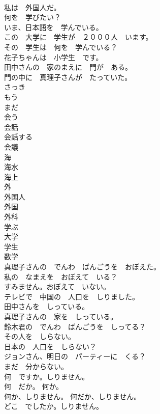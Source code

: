 \documentclass[8pt]{extreport}
\begin{document}
\begin{CJK}{UTF8}{min}
\\	私は　外国人だ。	
\\	何を　学びたい？	
\\	いま、日本語を　学んでいる。	
\\	この　大学に　学生が　２０００人　います。	
\\	その　学生は　何を　学んでいる？	
\\	花子ちゃんは　小学生　です。	
\\	田中さんの　家のまえに　門が　ある。	
\\	門の中に　真理子さんが　たっていた。	
\\	さっき	
\\	もう	
\\	まだ	
\\	会う	
\\	会話	
\\	会話する	
\\	会議	
\\	海	
\\	海水	
\\	海上	
\\	外	
\\	外国人	
\\	外国	
\\	外科	
\\	学ぶ	
\\	大学	
\\	学生	
\\	数学	
\\	真理子さんの　でんわ　ばんごうを　おぼえた。	
\\	私の　なまえを　おぼえて　いる？	
\\	すみません。おぼえて　いない。	
\\	テレビで　中国の　人口を　しりました。	
\\	田中さんを　しっている。	
\\	真理子さんの　家を　しっている。	
\\	鈴木君の　でんわ　ばんごうを　しってる？	
\\	その人を　しらない。	
\\	日本の　人口を　しらない？	
\\	ジョンさん、明日の　パーティーに　くる？	
\\	まだ　分からない。	
\\	何　ですか。しりません。	
\\	何　だか。 何か。	
\\	何か、しりません。 何だか、しりません。	
\\	どこ　でしたか。しりません。	

\end{CJK}
\end{document}
